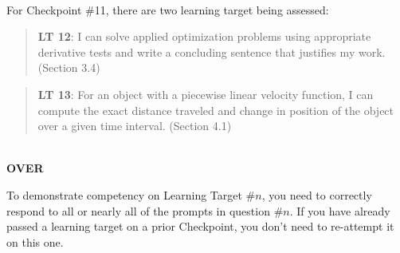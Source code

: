 \documentclass[11 pt]{article}
\begin{document}
\noindent \hrulefill \\

 For Checkpoint \#11, there are two learning target being assessed: 

\begin{quote}
{\bf LT 12}:  I can solve applied optimization problems using appropriate derivative tests and write a concluding sentence that justifies my work. (Section 3.4) 
\end{quote}

\begin{quote}
{\bf LT 13}:  For an object with a piecewise linear velocity function, I can compute the exact distance traveled and change in position of the object over a given time interval. (Section 4.1)
\end{quote}

\noindent \hrulefill \\

\vfill \hfill {\bf OVER} 

\pagebreak


\noindent To demonstrate competency on Learning Target \#$n$, you need to correctly respond to all or nearly all of the prompts in question \#$n$.  If you have already passed a learning target on a prior Checkpoint, you don't need to re-attempt it on this one.
  
\end{document}
